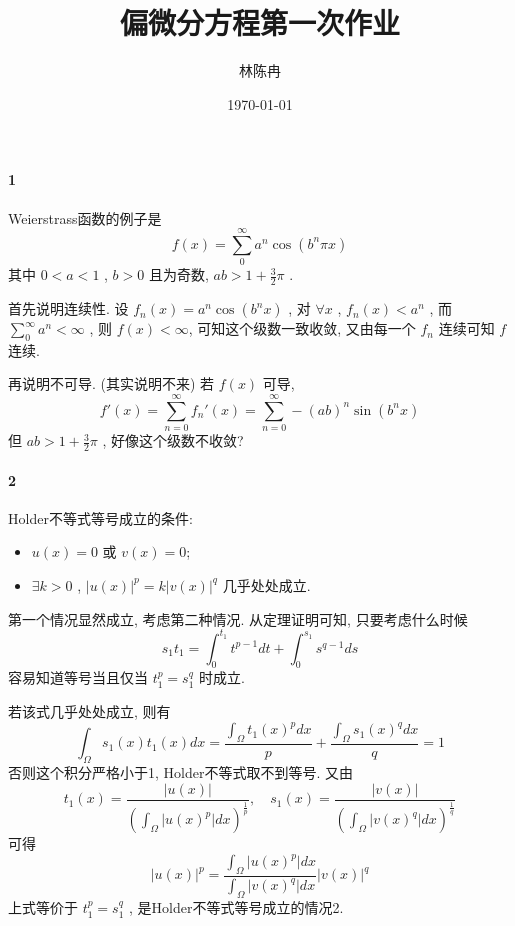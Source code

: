 \documentclass[a4paper, UTF8]{ctexart}				%
\title{偏微分方程第一次作业}
\author{林陈冉}
\date{\today}
\numberwithin{equation}{section}				%
\begin{document}
    \maketitle										%
    \paragraph{1}
        Weierstrass函数的例子是 
        \[
            f(x) = \sum^{\infty}_{0} a^n \cos (b^n \pi x)
        \]
        其中 $0 < a < 1$ , $b > 0$ 且为奇数, $ab > 1 + \frac{3}{2}\pi$ .

        首先说明连续性. 设 $f_n(x) = a^n \cos (b^n x)$ , 对 $\forall x$ , $f_n(x) < a^n$ , 而 $\sum^{\infty}_{0} a^n < \infty$ , 则 $f(x) < \infty$, 可知这个级数一致收敛, 又由每一个 $f_n$ 连续可知 $f$ 连续.
        
        再说明不可导. (其实说明不来) 若 $f(x)$ 可导, 
        \[
            f'(x) = \sum^{\infty}_{n=0} f_n'(x) = \sum^{\infty}_{n=0} - (ab)^n \sin (b^n x)
        \]
        但 $ab > 1 + \frac{3}{2} \pi$ , 好像这个级数不收敛?

    \paragraph{2}
        Holder不等式等号成立的条件: 
        \begin{itemize}
            \item $u(x) = 0$ 或 $v(x)=0$;
            \item $\exists k > 0$ , $\vert{u(x)}\vert^p = k \vert{v(x)}\vert^q$ 几乎处处成立.
        \end{itemize}

        第一个情况显然成立, 考虑第二种情况. 从定理证明可知, 只要考虑什么时候 
        \[
            s_1 t_1 = \int^{t_1}_{0} t^{p - 1}dt + \int^{s_1}_{0} s^{q - 1}ds
        \]
        容易知道等号当且仅当 $t_1^p = s_1^q$ 时成立.
        
        若该式几乎处处成立, 则有 
        \[
            \int^{}_{\Omega}s_1(x) t_1(x)dx = \frac{\int^{}_{\Omega} t_1(x)^pdx}{p} + \frac{\int^{}_{\Omega} s_1(x)^qdx}{q} = 1
        \]
        否则这个积分严格小于1, Holder不等式取不到等号. 又由 
        \[
            t_1(x) = \frac{\vert{u(x)}\vert}{(\int^{}_{\Omega} \vert{u(x)^p}\vert dx)^{\frac{1}{p}}} , 
            \quad 
            s_1(x) = \frac{\vert{v(x)}\vert}{(\int^{}_{\Omega} \vert{v(x)^q}\vert dx)^{\frac{1}{q}}}
        \]
        可得 
        \[
            \vert{u(x)}\vert^p = \frac{\int^{}_{\Omega} \vert{u(x)^p}\vert dx}{\int^{}_{\Omega} \vert{v(x)^q}\vert dx} \vert{v(x)}\vert^q
        \]
        上式等价于 $t_1^p = s_1^q$ , 是Holder不等式等号成立的情况2.
\end{document}
